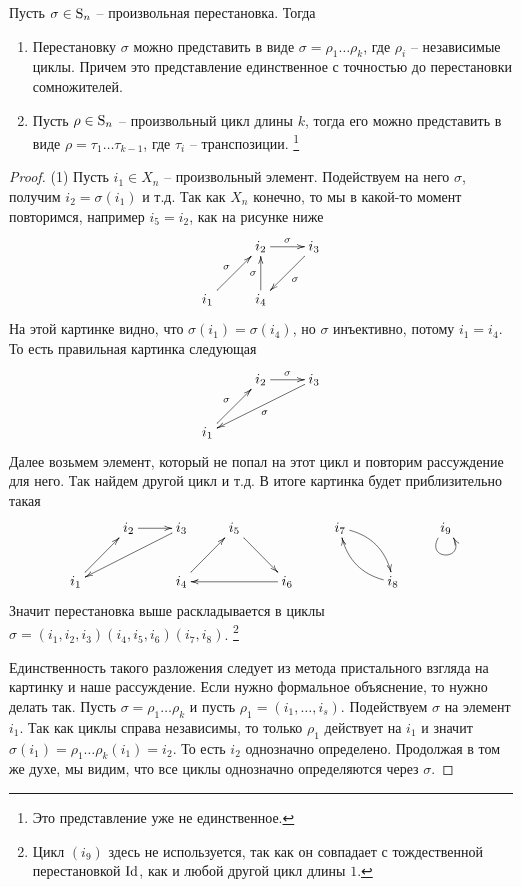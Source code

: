 \begin{claim}
\label{claim:PermutationStructure}
Пусть $\sigma\in\operatorname{S}_{n}$ -- произвольная перестановка.
Тогда
\begin{enumerate}
\item Перестановку $\sigma$ можно представить в виде $\sigma = \rho_1 \ldots \rho_k$, где $\rho_i$ -- независимые циклы.
Причем это представление единственное с точностью до перестановки сомножителей.

\item Пусть $\rho\in\operatorname{S}_{n}$ -- произвольный цикл длины $k$, тогда его можно представить в виде $\rho = \tau_1\ldots \tau_{k-1}$, где $\tau_i$ -- транспозиции.%
\footnote{Это представление уже не единственное.}
\end{enumerate}
\end{claim}
\begin{proof}
(1) Пусть $i_1\in X_n$ -- произвольный элемент.
Подействуем на него $\sigma$, получим $i_2 = \sigma(i_1)$ и т.д.
Так как $X_n$ конечно, то мы в какой-то момент повторимся, например $i_5 = i_2$, как на рисунке ниже
\[
\xymatrix{
	{}&{i_2}\ar[r]^{\sigma}&{i_3}\ar[dl]^{\sigma}\\
	{i_1}\ar[ru]^{\sigma}&{i_4}\ar[u]^{\sigma}&{}\\
}
\]
На этой картинке видно, что $\sigma(i_1) = \sigma(i_4)$, но $\sigma$ инъективно, потому $i_1 = i_4$.
То есть правильная картинка следующая
\[
\xymatrix{
	{}&{i_2}\ar[r]^{\sigma}&{i_3}\ar[dll]^{\sigma}\\
	{i_1}\ar[ru]^{\sigma}&{}&{}\\
}
\]
Далее возьмем элемент, который не попал на этот цикл и повторим рассуждение для него.
Так найдем другой цикл и т.д.
В итоге картинка будет приблизительно такая
\[
\xymatrix{
	{}&{i_2}\ar[r]&{i_3}\ar[dll]&{i_5}\ar[rd]&{}&{i_7}\ar@/^10pt/[dr]&{}&{i_9}\ar@(dl,dr)\\
	{i_1}\ar[ru]&{}&{i_4}\ar[ru]&{}&{i_6}\ar[ll]&{}&{i_8}\ar@/^10pt/[ul]&{}\\
}
\]
Значит перестановка выше раскладывается в циклы $\sigma = (i_1,i_2,i_3) (i_4,i_5,i_6)(i_7,i_8)$.%
\footnote{Цикл $(i_9)$ здесь не используется, так как он совпадает с тождественной перестановкой $\operatorname{Id}$, как и любой другой цикл длины $1$.} 

Единственность такого разложения следует из метода пристального взгляда на картинку и наше рассуждение.
Если нужно формальное объяснение, то нужно делать так.
Пусть $\sigma = \rho_1\ldots \rho_k$ и пусть $\rho_1 = (i_1,\ldots,i_s)$.
Подействуем $\sigma$ на элемент $i_1$.
Так как циклы справа независимы, то только $\rho_1$ действует на $i_1$ и значит $\sigma(i_1)=\rho_1 \ldots \rho_k(i_1) = i_2$.
То есть $i_2$ однозначно определено.
Продолжая в том же духе, мы видим, что все циклы однозначно определяются через $\sigma$.



\end{proof}
